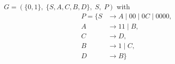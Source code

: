 \documentclass{article}
\begin{document}
$G=\left(\{0, 1\},\;\{ S, A, C, B, D\},\;S,\;P\right)$ with
\begin{align*}
P=\{	S &\rightarrow A\;|\;00\;|\;0C\;|\;0000, \\ 
	A &\rightarrow 11\;|\;B, \\ 
	C &\rightarrow D, \\ 
	B &\rightarrow 1\;|\;C, \\ 
	D &\rightarrow B\}
\end{align*}
\end{document}
